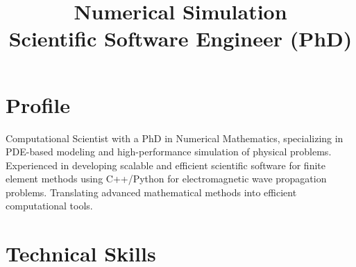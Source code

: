 \documentclass[11pt,a4paper]{moderncv}
\title{Numerical Simulation \vspace{4pt}
\\ Scientific Software Engineer (PhD)}
\begin{document}
\maketitle

\section{Profile}

{Computational Scientist with a PhD in Numerical Mathematics, specializing in PDE-based modeling and high-performance simulation of physical problems. Experienced in developing scalable and efficient scientific software for finite element methods using C++/Python for electromagnetic wave propagation problems. Translating advanced mathematical methods into efficient computational tools.}
\section{Technical Skills}



\end{document}
